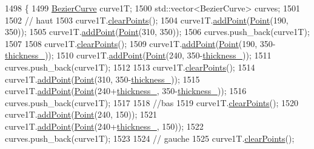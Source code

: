 \begin{DoxyCode}
1498               \{
1499     \mbox{\hyperlink{class_bezier_curve}{BezierCurve}} curve1T;
1500     std::vector<BezierCurve> curves;
1501 
1502     \textcolor{comment}{// haut}
1503     curve1T.\mbox{\hyperlink{class_bezier_curve_a0ba8ce66d5af5971ae6a1b506029728e}{clearPoints}}();
1504     curve1T.\mbox{\hyperlink{class_bezier_curve_a38d16c18b36ae45619b05e26e226cf34}{addPoint}}(\mbox{\hyperlink{class_point}{Point}}(190, 350));
1505     curve1T.\mbox{\hyperlink{class_bezier_curve_a38d16c18b36ae45619b05e26e226cf34}{addPoint}}(\mbox{\hyperlink{class_point}{Point}}(310, 350));
1506     curves.push\_back(curve1T);
1507 
1508     curve1T.\mbox{\hyperlink{class_bezier_curve_a0ba8ce66d5af5971ae6a1b506029728e}{clearPoints}}();
1509     curve1T.\mbox{\hyperlink{class_bezier_curve_a38d16c18b36ae45619b05e26e226cf34}{addPoint}}(\mbox{\hyperlink{class_point}{Point}}(190, 350-\mbox{\hyperlink{class_font_v1_aed8040e76be9a52833627b92f0fb4e5f}{thickness\_}}));
1510     curve1T.\mbox{\hyperlink{class_bezier_curve_a38d16c18b36ae45619b05e26e226cf34}{addPoint}}(\mbox{\hyperlink{class_point}{Point}}(240, 350-\mbox{\hyperlink{class_font_v1_aed8040e76be9a52833627b92f0fb4e5f}{thickness\_}}));
1511     curves.push\_back(curve1T);
1512 
1513     curve1T.\mbox{\hyperlink{class_bezier_curve_a0ba8ce66d5af5971ae6a1b506029728e}{clearPoints}}();
1514     curve1T.\mbox{\hyperlink{class_bezier_curve_a38d16c18b36ae45619b05e26e226cf34}{addPoint}}(\mbox{\hyperlink{class_point}{Point}}(310, 350-\mbox{\hyperlink{class_font_v1_aed8040e76be9a52833627b92f0fb4e5f}{thickness\_}}));
1515     curve1T.\mbox{\hyperlink{class_bezier_curve_a38d16c18b36ae45619b05e26e226cf34}{addPoint}}(\mbox{\hyperlink{class_point}{Point}}(240+\mbox{\hyperlink{class_font_v1_aed8040e76be9a52833627b92f0fb4e5f}{thickness\_}}, 350-\mbox{\hyperlink{class_font_v1_aed8040e76be9a52833627b92f0fb4e5f}{thickness\_}}));
1516     curves.push\_back(curve1T);
1517 
1518     \textcolor{comment}{//bas}
1519     curve1T.\mbox{\hyperlink{class_bezier_curve_a0ba8ce66d5af5971ae6a1b506029728e}{clearPoints}}();
1520     curve1T.\mbox{\hyperlink{class_bezier_curve_a38d16c18b36ae45619b05e26e226cf34}{addPoint}}(\mbox{\hyperlink{class_point}{Point}}(240, 150));
1521     curve1T.\mbox{\hyperlink{class_bezier_curve_a38d16c18b36ae45619b05e26e226cf34}{addPoint}}(\mbox{\hyperlink{class_point}{Point}}(240+\mbox{\hyperlink{class_font_v1_aed8040e76be9a52833627b92f0fb4e5f}{thickness\_}}, 150));
1522     curves.push\_back(curve1T);
1523 
1524     \textcolor{comment}{// gauche}
1525     curve1T.\mbox{\hyperlink{class_bezier_curve_a0ba8ce66d5af5971ae6a1b506029728e}{clearPoints}}();

\end{DoxyCode}
